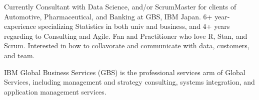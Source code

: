 

\begin{cvparagraph}

Currently Consultant with Data Science, and/or ScrumMaster for clients of Automotive, Pharmaceutical, and Banking at GBS\raisebox{0.1pt}{*}, IBM Japan.
6+ year-experience specializing Statistics in both univ and business, and 4+ years regarding to Consulting and Agile.
Fan and Practitioner who love R, Stan, and Scrum.
Interested in how to collavorate and communicate with data, customers, and team.

\raisebox{0.1pt}{*} IBM Global Business Services (GBS) is the professional services arm of Global Services, including management and strategy consulting, systems integration, and application management services.  
\end{cvparagraph}
